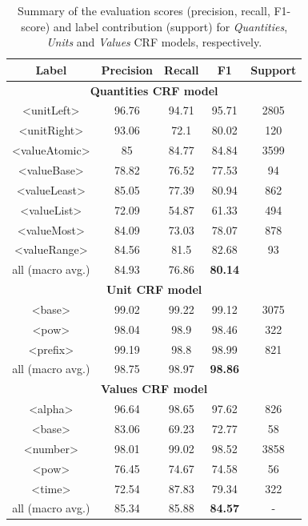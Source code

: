 \begin{table}[ht]
   \caption{Summary of the evaluation scores (precision, recall, F1-score) and label contribution (support) for \textit{Quantities}, \textit{Units} and \textit{Values} CRF models, respectively. }
   \label{tab:quantities-evaluation}
   \begin{tabular}{c|cccc}
        \toprule
        Label & Precision & Recall & F1 & Support\\
        \toprule
        \multicolumn{5}{c}{\textbf{Quantities CRF model}}\\
        \midrule
        <unitLeft>          & 96.76 & 94.71 & 95.71 & 2805  \\
        <unitRight>         & 93.06 & 72.1  & 80.02 & 120   \\
        <valueAtomic>       & 85    & 84.77 & 84.84 & 3599  \\
        <valueBase>         & 78.82 & 76.52 & 77.53 & 94    \\
        <valueLeast>        & 85.05 & 77.39 & 80.94 & 862   \\
        <valueList>         & 72.09 & 54.87 & 61.33 & 494   \\
        <valueMost>         & 84.09 & 73.03 & 78.07 & 878   \\
        <valueRange>        & 84.56 & 81.5  & 82.68 & 93    \\
        all (macro avg.)    & 84.93 & 76.86 & \textbf{80.14}\\
        \midrule
        \multicolumn{5}{c}{\textbf{Unit CRF model}}\\
        \midrule
        <base>              & 99.02 & 99.22 & 99.12 & 3075      \\
        <pow>               & 98.04 & 98.9  & 98.46 & 322       \\
        <prefix>            & 99.19 & 98.8  & 98.99 & 821       \\
        all (macro avg.)    & 98.75 & 98.97 & \textbf{98.86}    \\
        \midrule
        \multicolumn{5}{c}{\textbf{Values CRF model}}\\
        \midrule
        <alpha>             & 96.64  & 98.65 & 97.62  & 826      \\
        <base>              & 83.06  & 69.23 & 72.77  & 58       \\
        <number>            & 98.01  & 99.02 & 98.52  & 3858     \\
        <pow>               & 76.45  & 74.67 & 74.58  & 56       \\
        <time>              & 72.54  & 87.83 & 79.34  & 322      \\
        all (macro avg.)    & 85.34  & 85.88 & \textbf{84.57} & -\\
        \bottomrule
   \end{tabular}
\end{table}

